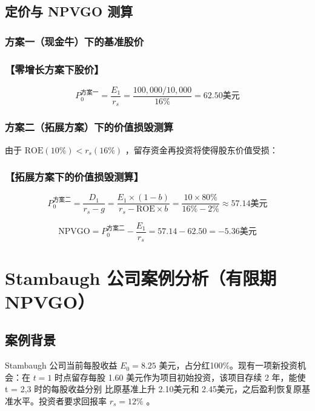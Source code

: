 \documentclass[lang=cn,10pt,color=blue]{elegantbook}
\begin{document}
\subsection{定价与 NPVGO 测算}

\subsubsection{方案一（现金牛）下的基准股价}

\subsubsection{【零增长方案下股价】}

$$
P _ {0} ^ {\text {方案一}} = \frac {E _ {1}}{r _ {s}} = \frac {1 0 0 , 0 0 0 / 1 0 , 0 0 0}{16 \%} = 6 2. 5 0 \text {美元}
$$

\subsubsection{方案二（拓展方案）下的价值损毁测算}

由于 $\mathrm { R O E } ( 1 0 \% ) < r _ { s } ( 1 6 \% )$ ，留存资金再投资将使得股东价值受损： 

\subsubsection{【拓展方案下的价值损毁测算】}

$$
P _ {0} ^ {\text {方案二}} = \frac {D _ {1}}{r _ {s} - g} = \frac {E _ {1} \times (1 - b)}{r _ {s} - \mathrm{ROE} \times b} = \frac {10 \times 80 \%}{16 \% - 2 \%} \approx 57.14 \text {美元}
$$

$$
\mathrm{NPVGO} = P _ {0} ^ {\text {方案二}} - \frac {E _ {1}}{r _ {s}} = 5 7. 1 4 - 6 2. 5 0 = - 5. 3 6 \text {美元}
$$

\section{Stambaugh 公司案例分析（有限期 NPVGO）}

\subsection{案例背景}

Stambaugh 公司当前每股收益 $E _ { 0 } = 8 . 2 5$ 美元，占分红100\%。现有一项新投资机会：在 $t = 1$ 时点留存每股 1.60 美元作为项目初始投资，该项目存续 2 年，能使 t = 2,3 时的每股收益分别 比原基准上升 2.10美元和 2.45美元，之后盈利恢复原基准水平。投资者要求回报率 $r _ { s } = 1 2 \%$ 。 
\end{document}
